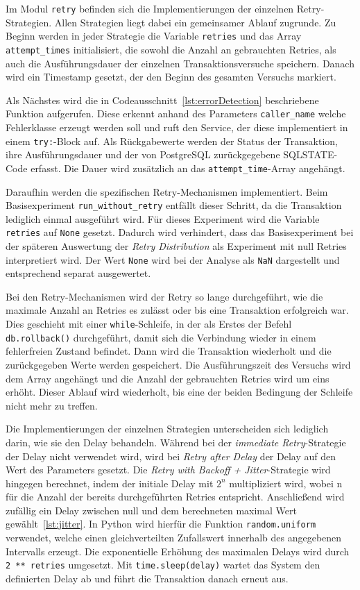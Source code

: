 
Im Modul \texttt{retry} befinden sich die Implementierungen der einzelnen Retry-Strategien.
Allen Strategien liegt dabei ein gemeinsamer Ablauf zugrunde.
Zu Beginn werden in jeder Strategie die Variable \texttt{retries} und das Array \texttt{attempt\_times}
initialisiert, die sowohl die Anzahl an gebrauchten Retries, als auch die Ausführungsdauer der einzelnen
Transaktionsversuche speichern.
Danach wird ein Timestamp gesetzt, der den Beginn des gesamten Versuchs markiert.

Als Nächstes wird die in Codeausschnitt~\ref{lst:errorDetection} beschriebene Funktion aufgerufen.
Diese erkennt anhand des Parameters \texttt{caller\_name} welche Fehlerklasse erzeugt werden soll und ruft den
Service, der diese implementiert in einem \texttt{try:}-Block auf.
Als Rückgabewerte werden der Status der Transaktion, ihre Ausführungsdauer und der von PostgreSQL zurückgegebene
SQLSTATE-Code erfasst.
Die Dauer wird zusätzlich an das \texttt{attempt\_time}-Array angehängt.

Daraufhin werden die spezifischen Retry-Mechanismen implementiert.
Beim Basisexperiment \texttt{run\_without\_retry} entfällt dieser Schritt, da die Transaktion lediglich einmal
ausgeführt wird.
Für dieses Experiment wird die Variable \texttt{retries} auf \texttt{None} gesetzt.
Dadurch wird verhindert, dass das Basisexperiment bei der späteren Auswertung der \emph{Retry Distribution} als
Experiment mit null Retries interpretiert wird.
Der Wert \texttt{None} wird bei der Analyse als \texttt{NaN} dargestellt und entsprechend separat ausgewertet.

Bei den Retry-Mechanismen wird der Retry so lange durchgeführt, wie die maximale Anzahl an Retries es
zulässt oder bis eine Transaktion erfolgreich war.
Dies geschieht mit einer \texttt{while}-Schleife, in der als Erstes der Befehl \texttt{db.rollback()} durchgeführt,
damit sich die Verbindung wieder in einem fehlerfreien Zustand befindet.
Dann wird die Transaktion wiederholt und die zurückgegeben Werte werden gespeichert.
Die Ausführungszeit des Versuchs wird dem Array angehängt und die Anzahl der gebrauchten Retries wird um eins erhöht.
Dieser Ablauf wird wiederholt, bis eine der beiden Bedingung der Schleife nicht mehr zu treffen.

Die Implementierungen der einzelnen Strategien unterscheiden sich lediglich darin, wie sie den Delay behandeln.
Während bei der \emph{immediate Retry}-Strategie der Delay nicht verwendet wird, wird bei \emph{Retry after Delay}
der Delay auf den Wert des Parameters gesetzt.
Die \emph{Retry with Backoff + Jitter}-Strategie wird hingegen berechnet, indem der initiale Delay mit $2^{n}$
multipliziert wird, wobei n für die Anzahl der bereits durchgeführten Retries entspricht.
Anschließend wird zufällig ein Delay zwischen null und dem berechneten maximal Wert gewählt~\ref{lst:jitter}.
In Python wird hierfür die Funktion \texttt{random.uniform} verwendet, welche einen gleichverteilten Zufallswert
innerhalb des angegebenen Intervalls erzeugt.
Die exponentielle Erhöhung des maximalen Delays wird durch \texttt{2 ** retries} umgesetzt.
Mit \texttt{time.sleep(delay)} wartet das System den definierten Delay ab und führt die Transaktion danach erneut aus.

